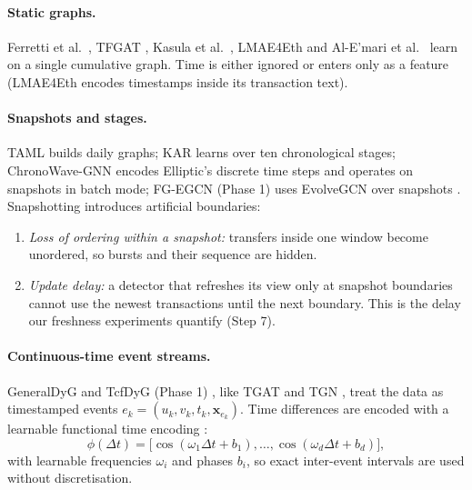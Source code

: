 \documentclass[11pt,a4paper]{article}
\begin{document}
\paragraph{Static graphs.} Ferretti et al.\ \cite{ferretti2025aml}, TFGAT \cite{li2025tfgat}, Kasula et al.\ \cite{kasula2025ajk}, LMAE4Eth \cite{jia2025lmae4eth} and Al-E'mari et al.\ \cite{alemari2026explainable} learn on a single cumulative graph. Time is either ignored or enters only as a feature (LMAE4Eth encodes timestamps inside its transaction text).

\paragraph{Snapshots and stages.} TAML \cite{rico2026taml} builds daily graphs; KAR \cite{tian2025kar} learns over ten chronological stages; ChronoWave-GNN \cite{lin2026chronowave} encodes Elliptic's discrete time steps and operates on snapshots in batch mode; FG-EGCN (Phase 1) uses EvolveGCN over snapshots \cite{han2026fgegcn}. Snapshotting introduces artificial boundaries:
\begin{enumerate}[leftmargin=*]
    \item \textit{Loss of ordering within a snapshot:} transfers inside one window become unordered, so bursts and their sequence are hidden.
    \item \textit{Update delay:} a detector that refreshes its view only at snapshot boundaries cannot use the newest transactions until the next boundary. This is the delay our freshness experiments quantify (Step 7).
\end{enumerate}

\paragraph{Continuous-time event streams.} GeneralDyG \cite{yang2025generaldyg} and TcfDyG (Phase 1) \cite{li2026tcfdyg}, like TGAT \cite{xu2020tgat} and TGN \cite{rossi2020tgn}, treat the data as timestamped events $e_k=(u_k,v_k,t_k,\mathbf{x}_{e_k})$. Time differences are encoded with a learnable functional time encoding \cite{xu2020tgat,rossi2020tgn}:
\begin{equation}
    \phi(\Delta t) = \big[\cos(\omega_1 \Delta t + b_1), \dots, \cos(\omega_d \Delta t + b_d)\big],
\end{equation}
with learnable frequencies $\omega_i$ and phases $b_i$, so exact inter-event intervals are used without discretisation.
\end{document}

